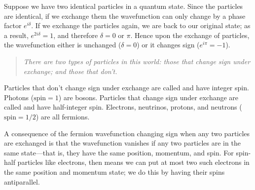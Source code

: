 Suppose we have two identical particles in a quantum state. Since the particles are identical, if we exchange them the wavefunction can only change by a phase factor $e^{i\delta}$. If we exchange the particles again, we are back to our original state; as a result, $e^{2i\delta} = 1$, and therefore $\delta = 0$ or $\pi$. Hence upon the exchange of particles, the wavefunction either is unchanged ($\delta=0$) or it changes sign ($e^{i\pi}=-1$).
\begin{quote}\itshape
    There are two types of particles in this world: those that change sign under exchange; and those that don't.
\end{quote}
Particles that don't change sign under exchange are called  and have integer spin. Photons ($\textrm{spin} = 1$) are bosons. Particles that change sign under exchange are called  and have half-integer spin. Electrons, neutrinos, protons, and neutrons ($\textrm{spin} = 1/2$) are all fermions. 

A consequence of the fermion wavefunction changing sign when any two particles are exchanged is that the wavefunction vanishes if any two particles are in the same state---that is, they have the same position, momentum, and spin. For spin-half particles like electrons, then means we can put at most two such electrons in the same position and momentum state; we do this by having their spins antiparallel.

